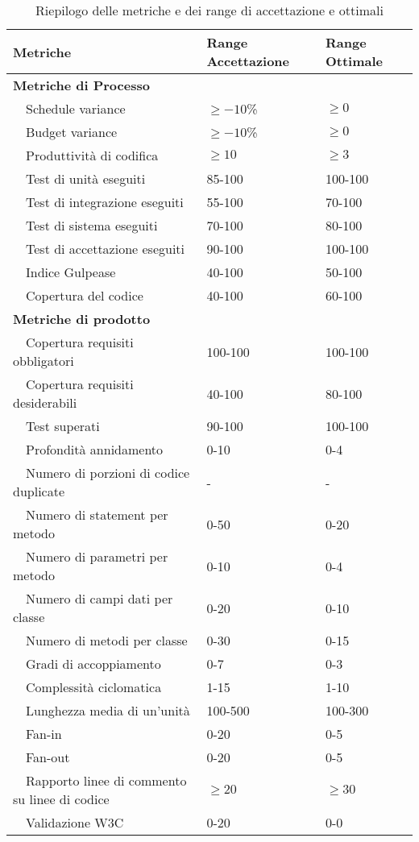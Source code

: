 	\begin{table}
	\begin{tabular}{|l|l|l|}
	\hline
	\textbf{Metriche} 						&\textbf{Range Accettazione} &\textbf{Range Ottimale} \\
	\hline
	\textbf{Metriche di Processo}					&				&\\
	\hline
	~~Schedule variance 							&$\geq{-10}$\%	&$\geq{0}$\\
	~~Budget variance 								&$\geq{-10}$\%	&$\geq{0}$\\
	~~Produttività di codifica 						&$\geq{10}$		&$\geq{3}$\\
	~~Test di unità eseguiti						&85-100			&100-100\\
	~~Test di integrazione eseguiti					&55-100			&70-100\\
	~~Test di sistema eseguiti						&70-100			&80-100\\
	~~Test di accettazione eseguiti					&90-100			&100-100\\
	~~Indice Gulpease								&40-100			&50-100\\
	~~Copertura del codice							&40-100			&60-100\\
	\hline
	\textbf{Metriche di prodotto}					&				&\\
	\hline
	~~Copertura requisiti obbligatori				&100-100		&100-100\\
	~~Copertura requisiti desiderabili				&40-100			&80-100\\
	~~Test superati									&90-100			&100-100\\
	~~Profondità annidamento						&0-10			&0-4\\
	~~Numero di porzioni di codice duplicate					&-			&-\\
	~~Numero di statement per metodo				&0-50			&0-20\\
	~~Numero di parametri per metodo				&0-10			&0-4\\
	~~Numero di campi dati per classe				&0-20			&0-10\\
	~~Numero di metodi per classe					&0-30			&0-15\\
	~~Gradi di accoppiamento						&0-7			&0-3\\
	~~Complessità ciclomatica						&1-15			&1-10\\
	~~Lunghezza media di un'unità					&100-500		&100-300\\
	~~Fan-in										&0-20			&0-5\\
	~~Fan-out										&0-20			&0-5\\
	~~Rapporto linee di commento su linee di codice	&$\geq{20}$		&$\geq{30}$\\
	~~Validazione W3C								&0-20			&0-0\\
	\hline
	\end{tabular}
	\caption{Riepilogo delle metriche e dei range di accettazione e ottimali}
	\end{table}
	

